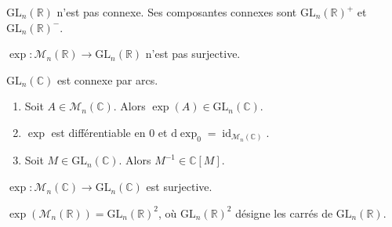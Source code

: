 
  \begin{proposition}
    $\mathrm{GL}_n(\mathbb{R})$ n'est pas connexe. Ses composantes connexes sont $\mathrm{GL}_n(\mathbb{R})^+$ et $\mathrm{GL}_n(\mathbb{R})^-$.
  \end{proposition}

  \begin{application}
    $\exp : \mathcal{M}_n(\mathbb{R}) \rightarrow \mathrm{GL}_n(\mathbb{R})$ n'est pas surjective.
  \end{application}


  \begin{proposition}
    $\mathrm{GL}_n(\mathbb{C})$ est connexe par arcs.
  \end{proposition}


  \begin{lemma}
    \begin{enumerate}[label={\bfseries(\roman*)}]
      \item Soit $A \in \mathcal{M}_n(\mathbb{C})$. Alors $\exp(A) \in \mathrm{GL}_n(\mathbb{C})$.
      \item $\exp$ est différentiable en $0$ et $\mathrm{d}\exp_0 = \operatorname{id}_{\mathcal{M}_n(\mathbb{C})}$.
      \item Soit $M \in \mathrm{GL}_n(\mathbb{C})$. Alors $M^{-1} \in \mathbb{C}[M]$.
    \end{enumerate}
  \end{lemma}


  \begin{theorem}
    $\exp : \mathcal{M}_n(\mathbb{C}) \rightarrow \mathrm{GL}_n(\mathbb{C})$ est surjective.
  \end{theorem}

  \begin{application}
    $\exp(\mathcal{M}_n(\mathbb{R})) = \mathrm{GL}_n(\mathbb{R})^2$, où $\mathrm{GL}_n(\mathbb{R})^2$ désigne les carrés de $\mathrm{GL}_n(\mathbb{R})$.
  \end{application}

